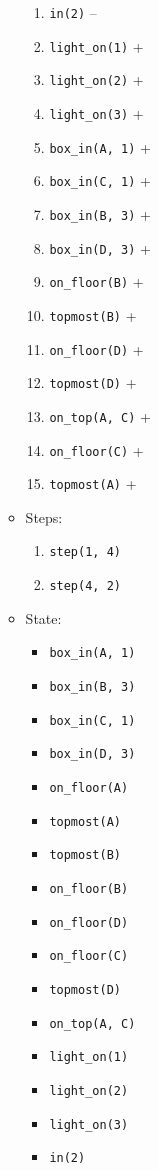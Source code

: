 \documentclass[12pt]{article}
\begin{document}
\begin{enumerate}
\begin{itemize}
\begin{enumerate}
          \item \texttt{in(2)} --
          \item \texttt{light\_on(1)} +
          \item \texttt{light\_on(2)} +
          \item \texttt{light\_on(3)} +
          \item \texttt{box\_in(A, 1)} +
          \item \texttt{box\_in(C, 1)} +
          \item \texttt{box\_in(B, 3)} +
          \item \texttt{box\_in(D, 3)} +
          \item \texttt{on\_floor(B)} +
          \item \texttt{topmost(B)} +
          \item \texttt{on\_floor(D)} +
          \item \texttt{topmost(D)} +
          \item \texttt{on\_top(A, C)} +
          \item \texttt{on\_floor(C)} +
          \item \texttt{topmost(A)} +
        \end{enumerate}
      \item Steps:
        \begin{enumerate}
          \item \texttt{step(1, 4)}
          \item \texttt{step(4, 2)}
        \end{enumerate}
      \item State:
        \begin{itemize}
          \item \texttt{box\_in(A, 1)}
          \item \texttt{box\_in(B, 3)}
          \item \texttt{box\_in(C, 1)}
          \item \texttt{box\_in(D, 3)}
          \item \texttt{on\_floor(A)}
          \item \texttt{topmost(A)}
          \item \texttt{topmost(B)}
          \item \texttt{on\_floor(B)}
          \item \texttt{on\_floor(D)}
          \item \texttt{on\_floor(C)}
          \item \texttt{topmost(D)}
          \item \texttt{on\_top(A, C)}
          \item \texttt{light\_on(1)}
          \item \texttt{light\_on(2)}
          \item \texttt{light\_on(3)}
          \item \texttt{in(2)}
        \end{itemize}
    \end{itemize}
\end{enumerate}
\end{document}
